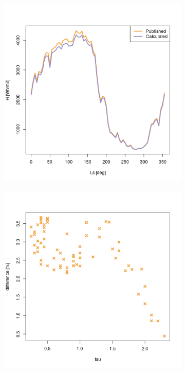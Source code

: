 \begin{figure}[H]
\captionsetup[subfigure]{justification=centering}
\vspace{-2ex}
\centering
    \setlength{\subfigureWidth}{0.50\textwidth}
    \setlength{\graphicsHeight}{80mm}
    \hypersetup{hidelinks=true}%
    \begin{subfigure}[t]{\subfigureWidth}
        \centering
            \includegraphics[height=\graphicsHeight]{sections/appendix/A/plots/h-exp-calc-at-vl2-with-beta-22-deg.png}
            \label{fig:sub:comparative-global-insolation-at-vl2-beta-optimal-daily-variations}
    \end{subfigure}\hfill
    \begin{subfigure}[t]{\subfigureWidth}
        \centering
            \includegraphics[height=\graphicsHeight]{sections/appendix/A/plots/h-diff-bet-exp-calc-at-vl2-with-beta-22-deg.png}

\end{subfigure}
\end{figure}

